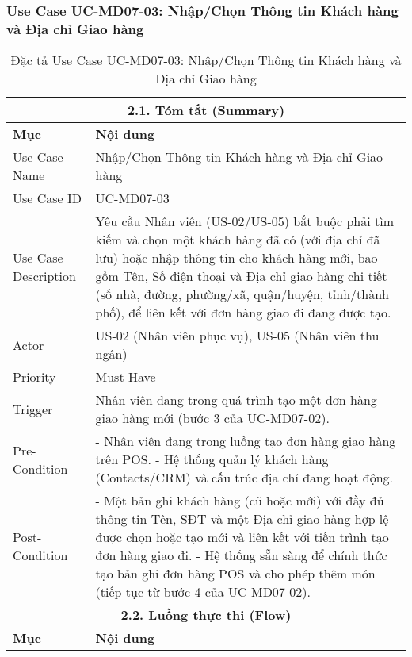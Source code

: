 \subsubsection{Use Case UC-MD07-03: Nhập/Chọn Thông tin Khách hàng và Địa chỉ Giao hàng}
\begin{longtable}{|m{4cm}|p{11cm}|}
\caption{Đặc tả Use Case UC-MD07-03: Nhập/Chọn Thông tin Khách hàng và Địa chỉ Giao hàng} \label{tab:uc_md07_03_final_full} \\
\hline
\multicolumn{2}{|c|}{\textbf{2.1. Tóm tắt (Summary)}} \\
\hline
\textbf{Mục} & \textbf{Nội dung} \\
\hline
\endhead %
\hline
\endfoot %
\hline
\endlastfoot %
Use Case Name & Nhập/Chọn Thông tin Khách hàng và Địa chỉ Giao hàng \\
\hline
Use Case ID & UC-MD07-03 \\
\hline
Use Case Description & Yêu cầu Nhân viên (US-02/US-05) bắt buộc phải tìm kiếm và chọn một khách hàng đã có (với địa chỉ đã lưu) hoặc nhập thông tin cho khách hàng mới, bao gồm Tên, Số điện thoại và Địa chỉ giao hàng chi tiết (số nhà, đường, phường/xã, quận/huyện, tỉnh/thành phố), để liên kết với đơn hàng giao đi đang được tạo. \\
\hline
Actor & US-02 (Nhân viên phục vụ), US-05 (Nhân viên thu ngân) \\
\hline
Priority & Must Have \\
\hline
Trigger & Nhân viên đang trong quá trình tạo một đơn hàng giao hàng mới (bước 3 của UC-MD07-02). \\
\hline
Pre-Condition & - Nhân viên đang trong luồng tạo đơn hàng giao hàng trên POS. \newline - Hệ thống quản lý khách hàng (Contacts/CRM) và cấu trúc địa chỉ đang hoạt động. \\
\hline
Post-Condition & - Một bản ghi khách hàng (cũ hoặc mới) với đầy đủ thông tin Tên, SĐT và một Địa chỉ giao hàng hợp lệ được chọn hoặc tạo mới và liên kết với tiến trình tạo đơn hàng giao đi. \newline - Hệ thống sẵn sàng để chính thức tạo bản ghi đơn hàng POS và cho phép thêm món (tiếp tục từ bước 4 của UC-MD07-02). \\
\hline
\multicolumn{2}{|c|}{\textbf{2.2. Luồng thực thi (Flow)}} \\
\hline
\textbf{Mục} & \textbf{Nội dung} \\
\hline

\end{longtable}
